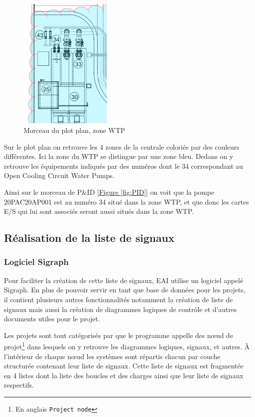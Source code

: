 \documentclass[11pt, openright]{book}
\begin{document}
\begin{figure}
    \vspace{-15pt}
    \includegraphics[width=0.4\textwidth]{./object/PlotPlan.png}
    \caption{Morceau du plot plan, zone WTP}
    \label{fig:plotplan}
\end{figure}
Sur le plot plan on retrouve les 4 zones de la centrale coloriés par des couleurs différentes. Ici la zone du WTP se distingue par une zone bleu.
Dedans on y retrouve les équipements indiqués par des numéros dont le 34 correspondant au Open Cooling Circuit Water Pumps.

Ainsi sur le morceau de P\&ID [\hyperref[fig:PID]{Figure \ref{fig:PID}}] on voit que la pompe 20PAC20AP001 est au numéro 34 situé dans la zone WTP, et que donc les cartes E/S qui lui sont associés seront aussi situés dans la zone WTP.


\subsection{Réalisation de la liste de signaux}

\subsubsection{Logiciel Sigraph}

Pour faciliter la création de cette liste de signaux, EAI utilise un logiciel appelé Sigraph. En plus de pouvoir servir en tant que base de données pour les projets, il contient plusieurs autres fonctionnalités notamment la création de liste de signaux mais aussi la création de diagrammes logiques de contrôle et d'autres documents utiles pour le projet.

Les projets sont tout catégorisés par que le programme appelle des nœud de projet\footnote{En anglais \texttt{Project node}} dans les\-quels on y retrouve les diagrammes logiques, signaux, et autres. À l'intérieur de chaque nœud les systèmes sont répartis chacun par couche structurée contenant leur liste de signaux. Cette liste de signaux est fragmentée en 4 listes dont la liste des boucles et des charges ainsi que leur liste de signaux respectifs.
\end{document}
